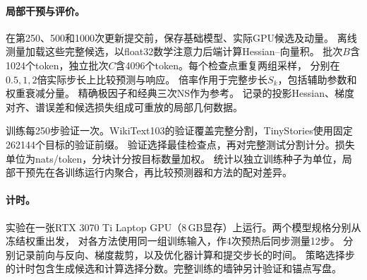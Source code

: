 \paragraph{局部干预与评价。}
在第250、500和1000次更新提交前，保存基础模型、实际GPU候选及动量。
离线测量加载这些完整候选，以float32数学注意力后端计算Hessian--向量积。
批次$B$含1024个token，独立批次$C$含4096个token。每个检查点重复两组采样，
分别在$0.5,1,2$倍实际步长上比较预测与响应。
倍率作用于完整步长$S_k$，包括辅助参数和权重衰减分量。
精确极因子和经典三次NS作为参考。
记录的投影Hessian、梯度对齐、谱误差和候选损失组成可重放的局部几何数据。

训练每250步验证一次。WikiText103的验证覆盖完整分割，TinyStories使用固定262144个目标的验证前缀。
验证选择最佳检查点，再对完整测试分割计分。损失单位为nats/token，分块计分按目标数量加权。
统计以独立训练种子为单位，局部干预先在各训练运行内聚合，再比较预测器和方法的配对差异。

\paragraph{计时。}
实验在一张RTX 3070 Ti Laptop GPU（8\,GB显存）上运行。两个模型规格分别从冻结权重出发，
对各方法使用同一组训练输入，作4次预热后同步测量12步。
分别记录前向与反向、梯度裁剪，以及优化器计算和提交步长的时间。
策略选择步的计时包含生成候选和计算选择分数。完整训练的墙钟另计验证和锚点写盘。
